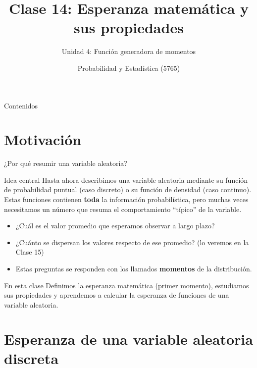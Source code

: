 \documentclass[aspectratio=169,11pt]{beamer}
\title[Prob. y Estadística]{Clase 14: Esperanza matemática y sus propiedades}
\subtitle{Unidad 4: Función generadora de momentos}
\institute[UNS]{Universidad Nacional del Sur \\ Departamento de Matemática}
\author{Probabilidad y Estadística (5765)}
\date{}
\begin{document}
\begin{frame}
\titlepage
\end{frame}

\begin{frame}{Contenidos}
\tableofcontents
\end{frame}

\section{Motivación}

\begin{frame}{¿Por qué resumir una variable aleatoria?}
\begin{block}{Idea central}
Hasta ahora describimos una variable aleatoria mediante su función de probabilidad puntual (caso discreto) o su función de densidad (caso continuo). Estas funciones contienen \textbf{toda} la información probabilística, pero muchas veces necesitamos un número que resuma el comportamiento ``típico'' de la variable.
\end{block}

\begin{itemize}
\item ¿Cuál es el valor promedio que esperamos observar a largo plazo?
\item ¿Cuánto se dispersan los valores respecto de ese promedio? (lo veremos en la Clase 15)
\item Estas preguntas se responden con los llamados \textbf{momentos} de la distribución.
\end{itemize}

\begin{alertblock}{En esta clase}
Definimos la esperanza matemática (primer momento), estudiamos sus propiedades y aprendemos a calcular la esperanza de funciones de una variable aleatoria.
\end{alertblock}
\end{frame}

\section{Esperanza de una variable aleatoria discreta}
\end{document}
